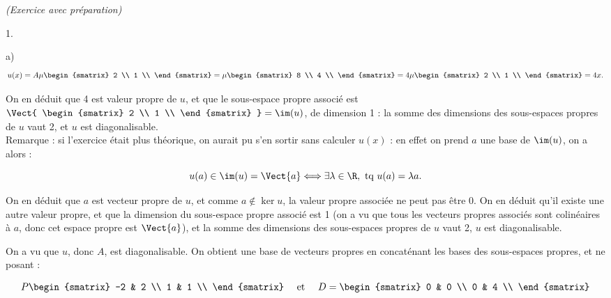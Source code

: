 \documentclass[11pt]{article}%
\begin{document}
\begin{exercice}{\it (Exercice avec préparation)}
\begin{noliste}{1.}
\begin{noliste}{a)}
\[
 u (x) = A \mu \begin{smatrix}
2 \\
1 \\
\end{smatrix}
 = \mu \begin{smatrix}
8 \\
4 \\
\end{smatrix}
 = 4 { \mu \begin{smatrix}
2 \\
1 \\
\end{smatrix}
} = 4 x. 
\]

 On en déduit que 4 est valeur propre de $u$, et que le sous-espace
propre associé est $ \Vect { \begin{smatrix}
2 \\
1 \\
\end{smatrix}
} = \im(u)$, de dimension 1 : la somme des dimensions des sous-espaces
propres de $u$ vaut 2, et $u$ est diagonalisable. \\

 Remarque : si l'exercice était plus théorique, on aurait pu s'en
sortir sans calculer $u ( x )$ : en effet on prend $a$ une base de
$\im(u)$, on a alors : 
 
\[
 u (a) \in \im(u) = \Vect{ a } \Longleftrightarrow \exists \lambda \in
\R, \text{ tq } u (a) = \lambda a. 
\]

 On en déduit que $a$ est vecteur propre de $u$, et comme $a \notin
\ker u$, la valeur propre associée ne peut pas être 0. On en déduit
qu'il existe une autre valeur propre, et que la dimension du
sous-espace propre associé est 1 (on a vu que tous les vecteurs propres
associés sont colinéaires à $a$, donc cet espace propre est
$\Vect{a}$), et la somme des dimensions des sous-espaces propres de $u$
vaut 2, $u$ est diagonalisable. \\

 \item On a vu que $u$, donc $A$, est diagonalisable. On obtient une
base de vecteurs propres en concaténant les bases des sous-espaces
propres, et ne posant : 
 
\[
 P \begin{smatrix}
-2 & 2 \\
1 & 1 \\
\end{smatrix}
\ \ \ \text{ et } \ \ \ D = \begin{smatrix}
0 & 0 \\
0 & 4 \\
\end{smatrix}
\]


\end{noliste}
\end{noliste}
\end{exercice}
\end{document}
